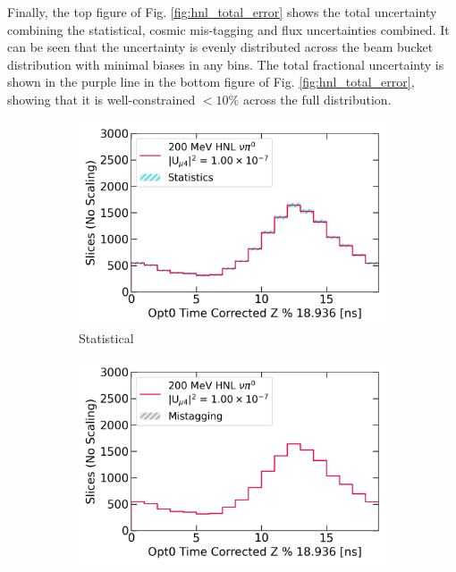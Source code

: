 Finally, the top figure of Fig. \ref{fig:hnl_total_error} shows the total uncertainty combining the statistical, cosmic mis-tagging and flux uncertainties combined.
It can be seen that the uncertainty is evenly distributed across the beam bucket distribution with minimal biases in any bins. 
The total fractional uncertainty is shown in the purple line in the bottom figure of Fig. \ref{fig:hnl_total_error}, showing that it is well-constrained $< 10\%$ across the full distribution.

\begin{figure}[htbp!]
        \begin{subfigure}[b]{0.495\textwidth}   
            \centering 
            \includegraphics[width=\textwidth]{hnl_statistics_error}
            \caption{Statistical}%
            \label{fig:hnl_stat}
        \end{subfigure}
        \hfill
        \begin{subfigure}[b]{0.495\textwidth}   
            \centering 
            \includegraphics[width=\textwidth]{hnl_mistagging_error}

\end{subfigure}
\end{figure}
